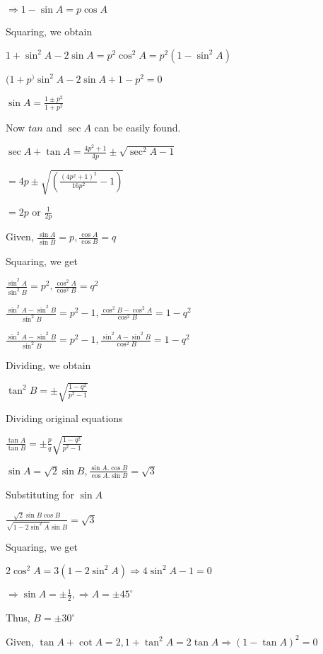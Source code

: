     $\Rightarrow 1 - \sin A = p\cos A$

    Squaring, we obtain

    $1 + \sin^2A - 2\sin A = p^2\cos^2A = p^2(1 - \sin^2A)$

    $(1 + p^)\sin^2A - 2\sin A + 1 - p^2 = 0$

    $\sin A = \frac{1 \pm p^2}{1 + p^2}$

    Now $tan$ and $\sec A$ can be easily found.

\item $\sec A + \tan A = \frac{4p^2 + 1}{4p} \pm \sqrt{\sec^2A - 1}$

    $= 4p \pm \sqrt{\left(\frac{(4p^2 + 1)^2}{16p^2} - 1\right)}$

    $= 2p$ or $\frac{1}{2p}$

\item Given, $\frac{\sin A}{\sin B} = p, \frac{\cos A}{\cos B} = q$

    Squaring, we get

    $\frac{\sin^2A}{\sin^2B} = p^2, \frac{\cos^2A}{\cos^2B}= q^2$

    $\frac{\sin^2A - \sin^2B}{\sin^2B} = p^2 - 1, \frac{\cos^2B - \cos^2A}{\cos^2B} = 1 - q^2$

    $\frac{\sin^2A - \sin^2B}{\sin^2B} = p^2 - 1, \frac{\sin^2A - \sin^2B}{\cos^2B} = 1 - q^2$

    Dividing, we obtain

    $\tan^2B = \pm \sqrt{\frac{1 - q^2}{p^2 - 1}}$

    Dividing original equations

    $\frac{\tan A}{\tan B} = \pm \frac{p}{q}\sqrt{\frac{1 - q^2}{p^2 - 1}}$

\item $\sin A = \sqrt{2}\sin B, \frac{\sin A.\cos B}{\cos A. \sin B} = \sqrt{3}$

    Substituting for $\sin A$

    $\frac{\sqrt{2}\sin B\cos B}{\sqrt{1 - 2\sin^2A}\sin B}  = \sqrt{3}$

    Squaring, we get

    $2\cos^2 A = 3(1 - 2\sin^2A) \Rightarrow 4\sin^2A - 1 = 0$

    $\Rightarrow \sin A = \pm \frac{1}{2}, \Rightarrow A = \pm 45^\circ$

    Thus, $B = \pm 30^\circ$

\item Given, $\tan A + \cot A = 2, 1 + \tan^2A = 2\tan A \Rightarrow (1 - \tan A)^2 = 0$

